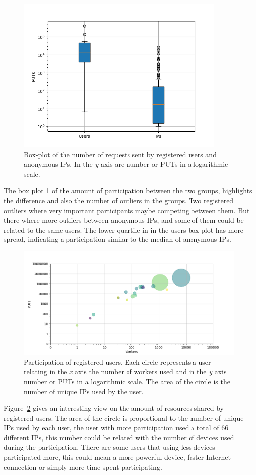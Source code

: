 \documentclass{llncs}
\begin{document}
%
\begin{figure}[htbp]
    \centering
        \includegraphics[width=4in]{img/puts_box.png}
    \caption{ Box-plot of the number of requests sent by registered users and anonymous IPs.
     In the \emph{y} axis are number or PUTs in a logarithmic scale.
    }
    \label{fig:box}
\end{figure}
%
The box plot \ref{fig:box} of the amount of participation between the two groups, highlights
the difference and also the number of outliers in the groups. Two registered 
outliers where very important participants maybe competing between them. But
there where more outliers between anonymous IPs, and some of them could be related
to the same users. The lower quartile in in the users box-plot has more
spread, indicating a participation similar to the median of anonymous IPs.

%
\begin{figure}[htbp]
    \centering
        \includegraphics[width=5in]{img/workers_put_ip.png}
    \caption{ Participation of registered users. Each circle represents a user relating  
        in the \emph{x} axis the number of workers used and in the \emph{y} axis 
        number or PUTs in a logarithmic scale. The area of the circle is the number 
        of unique IPs used by the user.
    }
    \label{fig:worker-put-ips}
\end{figure}
%
Figure~\ref{fig:worker-put-ips} gives an interesting view on the amount of
resources shared by registered users. The area of the circle is proportional
to the number of unique IPs used by each user, the user with more participation
used a total of 66 different IPs, this number could be related with the number
of devices used during the participation. There are some users that using less
devices participated more, this could mean a more powerful device, faster 
Internet connection or simply more time spent participating.
\end{document}
